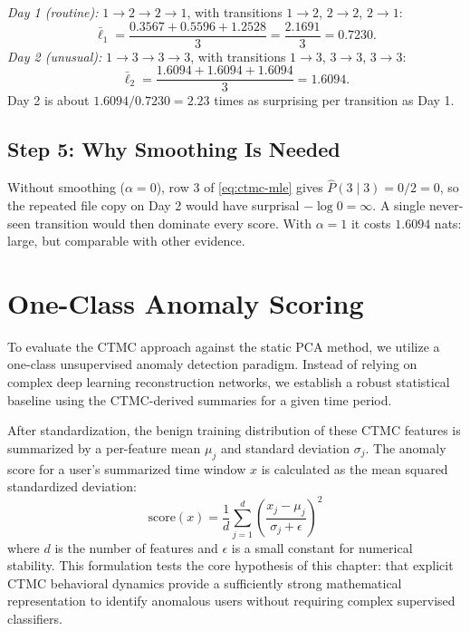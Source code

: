 \emph{Day 1 (routine):} $1 \to 2 \to 2 \to 1$, with transitions $1\to2$, $2\to2$, $2\to1$:
\[
\bar{\ell}_1 = \frac{0.3567 + 0.5596 + 1.2528}{3} = \frac{2.1691}{3} = 0.7230.
\]
\emph{Day 2 (unusual):} $1 \to 3 \to 3 \to 3$, with transitions $1\to3$, $3\to3$, $3\to3$:
\[
\bar{\ell}_2 = \frac{1.6094 + 1.6094 + 1.6094}{3} = 1.6094.
\]
Day 2 is about $1.6094/0.7230 = 2.23$ times as surprising per transition as Day 1.

\subsection{Step 5: Why Smoothing Is Needed}

Without smoothing ($\alpha=0$), row 3 of \eqref{eq:ctmc-mle} gives
$\hat{P}(3\mid 3) = 0/2 = 0$, so the repeated file copy on Day 2 would have surprisal
$-\log 0 = \infty$. A single never-seen transition would then dominate every score. With
$\alpha = 1$ it costs $1.6094$ nats: large, but comparable with other evidence.


\section{One-Class Anomaly Scoring}
To evaluate the CTMC approach against the static PCA method, we utilize a one-class unsupervised anomaly detection paradigm. Instead of relying on complex deep learning reconstruction networks, we establish a robust statistical baseline using the CTMC-derived summaries for a given time period.

After standardization, the benign training distribution of these CTMC features is summarized by a per-feature mean $\mu_j$ and standard deviation $\sigma_j$. The anomaly score for a user's summarized time window $x$ is calculated as the mean squared standardized deviation:
$$ \text{score}(x) = \frac{1}{d} \sum_{j=1}^{d} \left( \frac{x_j - \mu_j}{\sigma_j + \epsilon} \right)^2 $$
where $d$ is the number of features and $\epsilon$ is a small constant for numerical stability. This formulation tests the core hypothesis of this chapter: that explicit CTMC behavioral dynamics provide a sufficiently strong mathematical representation to identify anomalous users without requiring complex supervised classifiers.

